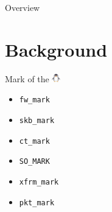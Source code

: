 \documentclass[black,white,aspectratio=169]{beamer}
\DeclareRobustCommand{\#}{\adjustbox{valign=B,totalheight=.57\baselineskip}{\oldhash}}%
\begin{document}
    \begin{frame}{Overview}
        \tableofcontents
    \end{frame}

    \section{Background}

    \begin{frame}[fragile]{Mark of the \includegraphics[height=1em]{penguin.png}}
        \begin{table}
            \begin{subtable}[l]{0.2\textwidth}
                \begin{itemize}
                    \item \verb+fw_mark+\medskip
                    \item \verb+skb_mark+\medskip
                    \item \verb+ct_mark+\medskip
                    \item \verb+SO_MARK+\medskip
                    \item \verb+xfrm_mark+\medskip
                    \item \verb+pkt_mark+

\end{itemize}
\end{subtable}
\end{table}
\end{frame}
\end{document}
